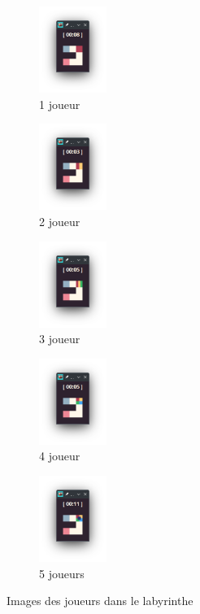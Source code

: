 \begin{figure}[!htb]
    \centering
    \begin{subfigure}{2.2cm}
        \includegraphics[width=2.2cm]{ressources/Implementation/Labyrinthe/Vue/Players/1Player.png}%
        \caption{1 joueur}
        \label{fig:1Player}
    \end{subfigure}
    \qquad
    \begin{subfigure}{2.2cm}
        \includegraphics[width=2.2cm]{ressources/Implementation/Labyrinthe/Vue/Players/2Players.png}%
        \caption{2 joueur}
        \label{fig:2Players}
    \end{subfigure}
    \qquad
    \begin{subfigure}{2.2cm}
        \includegraphics[width=2.2cm]{ressources/Implementation/Labyrinthe/Vue/Players/3Players.png}%
        \caption{3 joueur}
        \label{fig:3Players}
    \end{subfigure}
    \qquad
    \begin{subfigure}{2.2cm}
        \includegraphics[width=2.2cm]{ressources/Implementation/Labyrinthe/Vue/Players/4Players.png}%
        \caption{4 joueur}
        \label{fig:4Players}
    \end{subfigure}
    \qquad
    \begin{subfigure}{2.2cm}
        \includegraphics[width=2.2cm]{ressources/Implementation/Labyrinthe/Vue/Players/5Players.png}%
        \caption{5 joueurs}
        \label{fig:5Players}
    \end{subfigure}
    \caption{Images des joueurs dans le labyrinthe}
    \label{fig:PlayersInLabyrinth}
\end{figure}
\FloatBarrier

